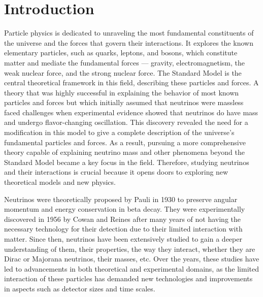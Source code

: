 \chapter{Introduction}



Particle physics is dedicated to unraveling the most fundamental constituents of the universe and the forces that govern their interactions. It explores the known elementary particles, such as quarks, leptons, and bosons, which constitute matter and mediate the fundamental forces --- gravity, electromagnetism, the weak nuclear force, and the strong nuclear force. The Standard Model is the central theoretical framework in this field, describing these particles and forces. A theory that was highly successful in explaining the behavior of most known particles and forces but which initially assumed that neutrinos were massless faced challenges when experimental evidence showed that neutrinos do have mass and undergo flavor-changing oscillation. This discovery revealed the need for a modification in this model to give a complete description of the universe’s fundamental particles and forces. As a result, pursuing a more comprehensive theory capable of explaining neutrino mass and other phenomena beyond the Standard Model became a key focus in the field. Therefore, studying neutrinos and their interactions is crucial because it opens doors to exploring new theoretical models and new physics.


Neutrinos were theoretically proposed by Pauli in 1930 to preserve angular momentum and energy conservation in beta decay. They were experimentally discovered in 1956 by Cowan and Reines after many years of not having the necessary technology for their detection due to their limited interaction with matter. Since then, neutrinos have been extensively studied to gain a deeper understanding of them, their properties, the way they interact, whether they are Dirac or Majorana neutrinos, their masses, etc. Over the years, these studies have led to advancements in both theoretical and experimental domains, as the limited interaction of these particles has demanded new technologies and improvements in aspects such as detector sizes and time scales.

